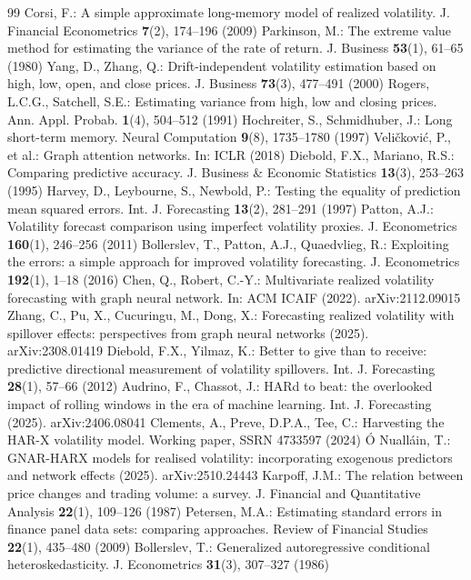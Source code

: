 \documentclass[runningheads]{llncs}
\begin{document}
\begin{thebibliography}{99}
 Corsi, F.: A simple approximate long-memory model of realized volatility. J. Financial Econometrics \textbf{7}(2), 174--196 (2009)
 Parkinson, M.: The extreme value method for estimating the variance of the rate of return. J. Business \textbf{53}(1), 61--65 (1980)
 Yang, D., Zhang, Q.: Drift-independent volatility estimation based on high, low, open, and close prices. J. Business \textbf{73}(3), 477--491 (2000)
 Rogers, L.C.G., Satchell, S.E.: Estimating variance from high, low and closing prices. Ann. Appl. Probab. \textbf{1}(4), 504--512 (1991)
 Hochreiter, S., Schmidhuber, J.: Long short-term memory. Neural Computation \textbf{9}(8), 1735--1780 (1997)
 Veli\v{c}kovi\'c, P., et al.: Graph attention networks. In: ICLR (2018)
 Diebold, F.X., Mariano, R.S.: Comparing predictive accuracy. J. Business \& Economic Statistics \textbf{13}(3), 253--263 (1995)
 Harvey, D., Leybourne, S., Newbold, P.: Testing the equality of prediction mean squared errors. Int. J. Forecasting \textbf{13}(2), 281--291 (1997)
 Patton, A.J.: Volatility forecast comparison using imperfect volatility proxies. J. Econometrics \textbf{160}(1), 246--256 (2011)
 Bollerslev, T., Patton, A.J., Quaedvlieg, R.: Exploiting the errors: a simple approach for improved volatility forecasting. J. Econometrics \textbf{192}(1), 1--18 (2016)
 Chen, Q., Robert, C.-Y.: Multivariate realized volatility forecasting with graph neural network. In: ACM ICAIF (2022). arXiv:2112.09015
 Zhang, C., Pu, X., Cucuringu, M., Dong, X.: Forecasting realized volatility with spillover effects: perspectives from graph neural networks (2025). arXiv:2308.01419
 Diebold, F.X., Yilmaz, K.: Better to give than to receive: predictive directional measurement of volatility spillovers. Int. J. Forecasting \textbf{28}(1), 57--66 (2012)
 Audrino, F., Chassot, J.: HARd to beat: the overlooked impact of rolling windows in the era of machine learning. Int. J. Forecasting (2025). arXiv:2406.08041
 Clements, A., Preve, D.P.A., Tee, C.: Harvesting the HAR-X volatility model. Working paper, SSRN 4733597 (2024)
 \'O Nuall\'ain, T.: GNAR-HARX models for realised volatility: incorporating exogenous predictors and network effects (2025). arXiv:2510.24443
 Karpoff, J.M.: The relation between price changes and trading volume: a survey. J. Financial and Quantitative Analysis \textbf{22}(1), 109--126 (1987)
 Petersen, M.A.: Estimating standard errors in finance panel data sets: comparing approaches. Review of Financial Studies \textbf{22}(1), 435--480 (2009)
 Bollerslev, T.: Generalized autoregressive conditional heteroskedasticity. J. Econometrics \textbf{31}(3), 307--327 (1986)
\end{thebibliography}
\end{document}
